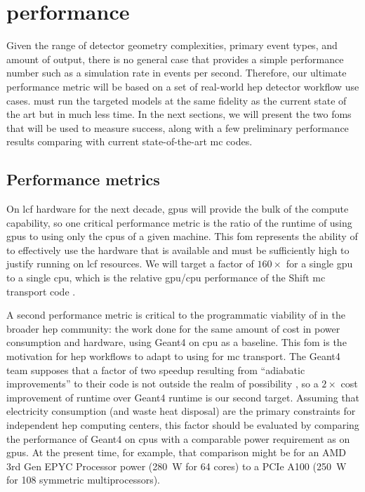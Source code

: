 \section{\celeritas performance}

Given the range of detector geometry complexities, primary event types, and
amount of output, there is no general case that provides a simple performance
number such as a simulation rate in events per second. Therefore, our ultimate
performance metric will be based on a set of real-world \acs{hep} detector
workflow use cases. \celeritas must run the targeted models at the same fidelity
as the current state of the art but in much less time. In the next sections,  we
will present the two \acp{fom} that will be used to measure success, along with
a few preliminary performance results comparing \celeritas with current
state-of-the-art \ac{mc} codes.

\subsection{Performance metrics}

On \ac{lcf} hardware for the next decade, \acp{gpu} will provide the bulk of the
compute capability, so one critical performance metric is the ratio of the
runtime of \celeritas using \acp{gpu} to using only the \acp{cpu} of a given
machine. This \ac{fom} represents the ability of \celeritas to effectively use
the hardware that is available and must be sufficiently high to justify running
on \ac{lcf} resources. We will target a factor of $160\times$ for a single
\ac{gpu} to a single \ac{cpu}, which is the relative \ac{gpu}/\ac{cpu}
performance of the Shift \ac{mc} transport code
\cite{hamilton_continuous-energy_2019}.

A second performance metric is critical to the programmatic viability of
\celeritas in the broader \ac{hep} community: the work done for the same amount
of cost in power consumption and hardware, using Geant4 on \ac{cpu} as a
baseline. This \ac{fom} is the motivation for \ac{hep} workflows to adapt to
using \celeritas for \ac{mc} transport. The Geant4 team supposes that a factor
of two speedup resulting from ``adiabatic improvements'' to their code is not
outside the realm of possibility \cite{marc_verderi_geant4_2021}, so a $2
\times$ cost improvement of \celeritas runtime over Geant4 runtime is our second
target. Assuming that electricity consumption (and waste heat disposal) are the
primary constraints for independent \ac{hep} computing centers, this factor
should be evaluated by comparing the performance of Geant4 on \acp{cpu} with a
comparable power requirement as \celeritas on \acp{gpu}. At the present time,
for example, that comparison might be for an AMD 3rd Gen EPYC Processor power
(\SI{280}{\watt} for 64 cores) to a PCIe \nvidia A100 (\SI{250}{\watt} for 108
symmetric multiprocessors).


